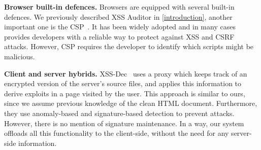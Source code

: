 \noindent \textbf{Browser built-in defences.}  Browsers are equipped
with several built-in defences. We previously described XSS
Auditor in \autoref{introduction}, another important one is the 
 \ac{CSP}~\cite{CSP}. It has been widely adopted and
in many cases provides developers with a reliable way to protect
against \ac{XSS} and \ac{CSRF} attacks. However, \ac{CSP} requires the developer to identify which scripts
might be malicious.

\noindent \textbf{Client and server hybrids.}
XSS-Dec~\cite{Sundareswaran:2012:XHS:2352970.2352994} uses a proxy which keeps track of an encrypted version of the server's source files, and applies this information to derive exploits in a page visited by the user. This approach is similar to ours, since we assume previous
knowledge of the clean HTML document. Furthermore, they use anomaly-based and signature-based detection to prevent attacks. However, there is no mention of signature maintenance. In a way, our system offloads all this functionality to the client-side, without the need for any server-side information.

